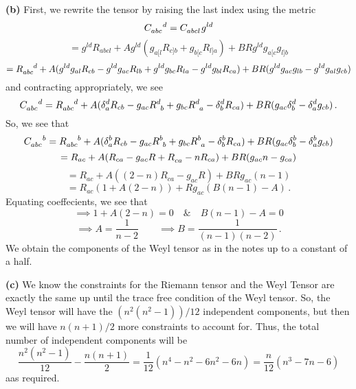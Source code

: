 \documentclass[10pt]{article}
\begin{document}
\textbf{(b)} First, we rewrite the tensor by raising the last index using the metric
\[ \tensor{C}{_{abc}^{d}} = \tensor{C}{_{abcl}}\tensor{g}{^{ld}} \]
\[ = g^{ld}R_{abcl} + Ag^{ld}(g_{a[l}R_{c]b} + g_{b[c}R_{l]a}) + BRg^{ld}g_{a[c}g_{l]b} \]
\[ = \tensor{R}{_{abc}^{d}} + A(g^{ld}g_{al}R_{cb} - g^{ld}g_{ac}R_{lb} + g^{ld}g_{bc}R_{la} - g^{ld}g_{bl}R_{ca}) + BR(g^{ld}g_{ac}g_{lb} - g^{ld}g_{al}g_{cb}) \]
and contracting appropriately, we see
\[ \tensor{C}{_{abc}^{d}} = \tensor{R}{_{abc}^{d}} +A(\delta^{d}_{a}R_{cb} - g_{ac}\tensor{R}{^{d}_{b}} + g_{bc}\tensor{R}{^{d}_{a}} - \delta^{d}_{b}R_{ca}) + BR(g_{ac}\delta^{d}_{b} - \delta_{a}^{d}g_{cb}) \, .\]
So, we see that
\[ \tensor{C}{_{abc}^{b}} = \tensor{R}{_{abc}^{b}} +A(\delta^{b}_{a}R_{cb} - g_{ac}\tensor{R}{^{b}_{b}} + g_{bc}\tensor{R}{^{b}_{a}} - \delta^{b}_{b}R_{ca}) + BR(g_{ac}\delta^{b}_{b} - \delta_{a}^{b}g_{cb}) \]
\[ = R_{ac} +A(R_{ca} - g_{ac}R + \tensor{R}{_{ca}} - nR_{ca}) + BR(g_{ac}n - g_{ca}) \]
\[ = R_{ac} + A((2 - n)R_{ca} - g_{ac}R) + BRg_{ac}(n-1)\]
\[ = R_{ac}(1 + A(2-n)) + Rg_{ac}(B(n-1) - A)\,. \]
Equating coeffecients, we see that
\[ \implies 1 + A(2-n) = 0  \quad \& \quad B(n-1) - A = 0 \]
\[ \implies A = \frac{1}{n-2} \quad \quad \implies B = \frac{1}{(n-1)(n-2)} \, .\]
We obtain the components of the Weyl tensor as in the notes up to a constant of a half.

\textbf{(c)} We know the constraints for the Riemann tensor and the Weyl Tensor are exactly the same up until the trace free condition of the Weyl tensor. So, the Weyl tensor will have the $(n^{2}(n^{2} - 1))/12$ independent components, but then we will have $n(n+1)/2$ more constraints to account for. Thus, the total number of independent components will be
\[ \frac{n^{2}(n^{2} - 1)}{12} - \frac{n(n+1)}{2} = \frac{1}{12}\left(n^{4} - n^{2} - 6n^{2} - 6n\right) = \frac{n}{12}(n^{3} - 7n - 6) \]
aas required. 
\end{document}
